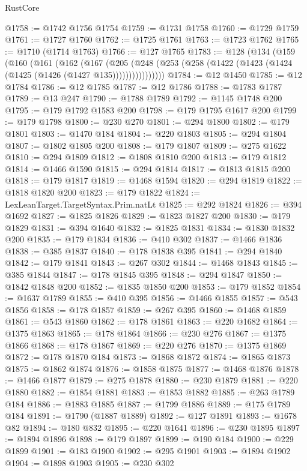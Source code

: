 \begin{lexlean}{RustCore}
\begin{coremodule}
@1758 := @1742 @1756 @1754
@1759 := @1731 @1758
@1760 := @1729 @1759
@1761 := @1727 @1760
@1762 := @1725 @1761
@1763 := @1723 @1762
@1765 := @1710 (@1714 @1763)
@1766 := @127 @1765
@1783 := @128
    (@134
      (@159
        (@160
          (@161
            (@162
              (@167
                (@205
                  (@248 (@253 (@258 (@1422 (@1423 (@1424 (@1425 (@1426 (@1427 @135))))))))))))))))
@1784 := @12 @1450
@1785 := @12 @1784
@1786 := @12 @1785
@1787 := @12 @1786
@1788 := @1783 @1787
@1789 := @13 @247
@1790 := @1788 @1789
@1792 := @1145 @1748 @200
@1795 := @179 @1792 @1583 @200
@1798 := @179 @1795 @1617 @200
@1799 := @179 @1798
@1800 := @230 @270
@1801 := @294 @1800
@1802 := @179 @1801
@1803 := @1470 @184
@1804 := @220 @1803
@1805 := @294 @1804
@1807 := @1802 @1805 @200
@1808 := @179 @1807
@1809 := @275 @1622
@1810 := @294 @1809
@1812 := @1808 @1810 @200
@1813 := @179 @1812
@1814 := @1466 @1590
@1815 := @294 @1814
@1817 := @1813 @1815 @200
@1818 := @179 @1817
@1819 := @1468 @1594
@1820 := @294 @1819
@1822 := @1818 @1820 @200
@1823 := @179 @1822
@1824 := LexLeanTarget.TargetSyntax.Prim.natLt
@1825 := @292 @1824
@1826 := @394 @1692
@1827 := @1825 @1826
@1829 := @1823 @1827 @200
@1830 := @179 @1829
@1831 := @394 @1640
@1832 := @1825 @1831
@1834 := @1830 @1832 @200
@1835 := @179 @1834
@1836 := @410 @302
@1837 := @1466 @1836
@1838 := @385 @1837
@1840 := @178 @1838 @395
@1841 := @294 @1840
@1842 := @179 @1841
@1843 := @267 @302
@1844 := @1468 @1843
@1845 := @385 @1844
@1847 := @178 @1845 @395
@1848 := @294 @1847
@1850 := @1842 @1848 @200
@1852 := @1835 @1850 @200
@1853 := @179 @1852
@1854 := @1637 @1789
@1855 := @410 @395
@1856 := @1466 @1855
@1857 := @543 @1856
@1858 := @178 @1857
@1859 := @267 @395
@1860 := @1468 @1859
@1861 := @543 @1860
@1862 := @178 @1861
@1863 := @220 @1682
@1864 := @1375 @1863
@1865 := @178 @1864
@1866 := @230 @276
@1867 := @1375 @1866
@1868 := @178 @1867
@1869 := @220 @276
@1870 := @1375 @1869
@1872 := @178 @1870 @184
@1873 := @1868 @1872
@1874 := @1865 @1873
@1875 := @1862 @1874
@1876 := @1858 @1875
@1877 := @1468 @1876
@1878 := @1466 @1877
@1879 := @275 @1878
@1880 := @230 @1879
@1881 := @220 @1880
@1882 := @1854 @1881
@1883 := @1853 @1882
@1885 := @263 @1789 @184
@1886 := @1883 @1885
@1887 := @1799 @1886
@1889 := @175 @1789 @184
@1891 := @1790 (@1887 @1889)
@1892 := @127 @1891
@1893 := @1678 @82
@1894 := @180 @832
@1895 := @220 @1641
@1896 := @230 @1895
@1897 := @1894 @1896
@1898 := @179 @1897
@1899 := @190 @184
@1900 := @229 @1899
@1901 := @183 @1900
@1902 := @295 @1901
@1903 := @1894 @1902
@1904 := @1898 @1903
@1905 := @230 @302

\end{coremodule}
\end{lexlean}
